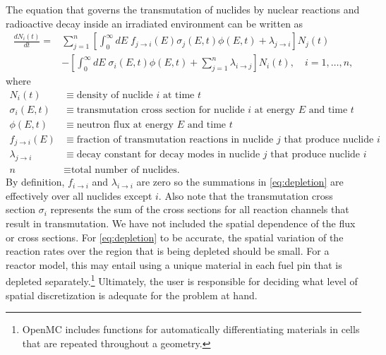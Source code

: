 \documentclass[3p,authoryear]{elsarticle}
\begin{document}
The equation that governs the transmutation of nuclides by nuclear reactions and
radioactive decay inside an irradiated environment can be written as
\begin{equation}
  \label{eq:depletion}
  \begin{split}
  \frac{dN_i(t)}{dt} = &\sum\limits_{j=1}^n \left [ \int_0^\infty dE \;
  f_{j \rightarrow i}(E) \sigma_j (E, t) \phi(E,t) + \lambda_{j\rightarrow i}
  \right ] N_j(t) \\ &- \left [\int_0^\infty dE \; \sigma_i (E,t) \phi(E,t) +
  \sum\limits_{j=1}^n \lambda_{i\rightarrow j} \right ] N_i(t), \quad i=1,\dots,n ,
  \end{split}
\end{equation}
where
\begin{equation*}
  \begin{split}
  N_i(t) &\equiv \text{density of nuclide $i$ at time $t$} \\
  \sigma_i(E,t) &\equiv \text{transmutation cross section for nuclide $i$ at energy $E$ and time $t$} \\
  \phi(E,t) &\equiv \text{neutron flux at energy $E$ and time $t$} \\
  f_{j \rightarrow i}(E) &\equiv \text{fraction of transmutation reactions in nuclide $j$ that produce nuclide $i$} \\
  \lambda_{j \rightarrow i} &\equiv \text{decay constant for decay modes in nuclide $j$ that produce nuclide $i$} \\
  n &\equiv \text{total number of nuclides.}
  \end{split}
\end{equation*}
By definition, $f_{i\rightarrow i}$ and $\lambda_{i\rightarrow i}$ are zero so
the summations in \cref{eq:depletion} are effectively over all nuclides except
$i$. Also note that the transmutation cross section $\sigma_i$ represents the
sum of the cross sections for all reaction channels that result in
transmutation. We have not included the spatial dependence of the flux or cross
sections. For \cref{eq:depletion} to be accurate, the spatial variation of the
reaction rates over the region that is being depleted should be small. For a
reactor model, this may entail using a unique material in each fuel pin that is
depleted separately.\footnote{OpenMC includes functions for automatically
differentiating materials in cells that are repeated throughout a geometry.}
Ultimately, the user is responsible for deciding what level of spatial
discretization is adequate for the problem at hand.
\end{document}
